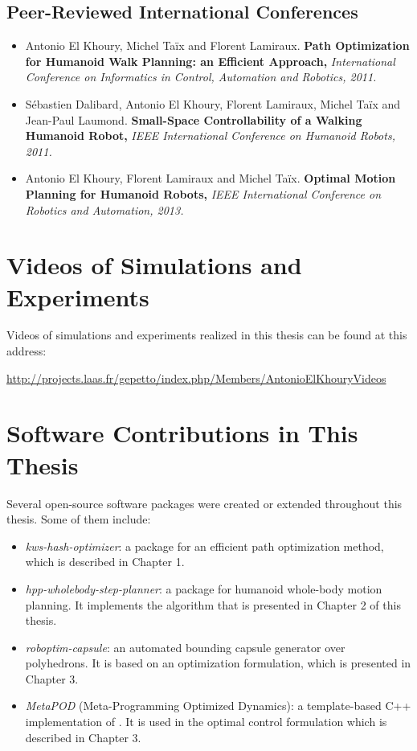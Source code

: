 \subsection*{Peer-Reviewed International Conferences}
\begin{itemize}
\item Antonio El Khoury, Michel Ta\"ix and Florent
  Lamiraux. \textbf{Path Optimization for Humanoid Walk Planning: an
    Efficient Approach,} \textit{International Conference on
    Informatics in Control, Automation and Robotics, 2011.}

\item S\'ebastien Dalibard, Antonio El Khoury, Florent Lamiraux,
  Michel Ta\"ix and Jean-Paul Laumond. \textbf{Small-Space
    Controllability of a Walking Humanoid Robot,} \textit{IEEE
    International Conference on Humanoid Robots, 2011.}

\item Antonio El Khoury, Florent Lamiraux and Michel
  Ta\"ix. \textbf{Optimal Motion Planning for Humanoid Robots,}
  \textit{IEEE International Conference on Robotics and Automation,
    2013.}
\end{itemize}

\section*{Videos of Simulations and Experiments}

Videos of simulations and experiments realized in this thesis can be
found at this address:

\url{http://projects.laas.fr/gepetto/index.php/Members/AntonioElKhouryVideos}

\section*{Software Contributions in This Thesis}

Several open-source software packages were created or extended
throughout this thesis. Some of them include:

\begin{itemize}
  \item \textit{kws-hash-optimizer}: a package for an efficient path
    optimization method, which is described in Chapter 1.
  \item \textit{hpp-wholebody-step-planner}: a package for humanoid whole-body
    motion planning. It implements the algorithm that is presented in
    Chapter 2 of this thesis.
  \item \textit{roboptim-capsule}: an automated bounding capsule generator over
    polyhedrons. It is based on an optimization formulation, which is
    presented in Chapter 3.
  \item \textit{MetaPOD} (Meta-Programming Optimized Dynamics): a
    template-based C++ implementation of \cite{feat08}. It is used in
    the optimal control formulation which is described in Chapter 3.
\end{itemize}
